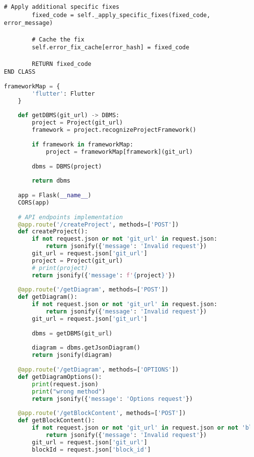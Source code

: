 \begin{lstlisting}[language=pseudocode, caption={$\texttt{Test\_Generator}$ class (Pseudocode).}, label={lst:14}]
        # Apply additional specific fixes
        fixed_code = self._apply_specific_fixes(fixed_code, error_message)
        
        # Cache the fix
        self.error_fix_cache[error_hash] = fixed_code
        
        RETURN fixed_code
END CLASS
\end{lstlisting}

\begin{lstlisting}[language=Python, caption={$\texttt{main.py}$ file.}, label={lst:15}]
    frameworkMap = {
        'flutter': Flutter
    }
    
    def getDBMS(git_url) -> DBMS:
        project = Project(git_url)
        framework = project.recognizeProjectFramework()
        
        if framework in frameworkMap:
            project = frameworkMap[framework](git_url)
            
        dbms = DBMS(project)
        
        return dbms
    
    app = Flask(__name__)
    CORS(app)
    
    # API endpoints implementation
    @app.route('/createProject', methods=['POST'])
    def createProject():
        if not request.json or not 'git_url' in request.json:
            return jsonify({'message': 'Invalid request'})
        git_url = request.json['git_url']
        project = Project(git_url)
        # print(project)
        return jsonify({'message': f'{project}'})
    
    @app.route('/getDiagram', methods=['POST'])
    def getDiagram():
        if not request.json or not 'git_url' in request.json:
            return jsonify({'message': 'Invalid request'})
        git_url = request.json['git_url']
        
        dbms = getDBMS(git_url)
        
        diagram = dbms.getJsonDiagram()
        return jsonify(diagram)
    
    @app.route('/getDiagram', methods=['OPTIONS'])
    def getDiagramOptions():
        print(request.json)
        print("wrong method")
        return jsonify({'message': 'Options request'})
    
    @app.route('/getBlockContent', methods=['POST'])
    def getBlockContent():
        if not request.json or not 'git_url' in request.json or not 'block_id' in request.json:
            return jsonify({'message': 'Invalid request'})
        git_url = request.json['git_url']
        blockId = request.json['block_id']
        

\end{lstlisting}
